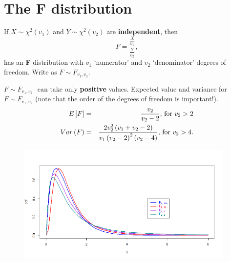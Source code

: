 \documentclass[smaller]{beamer}\usepackage[]{graphicx}\usepackage[]{color}
\begin{document}
\section{The F distribution}

\begin{frame}{\secname}
  \begin{definition}
  If $X\sim \chi ^{2}(v_{1})$ and $Y\sim \chi ^{2}(v_{2})$ are \textbf{%
  independent}, then%
  \begin{equation*}
  F=\frac{\frac{X}{v_{1}}}{\frac{Y}{v_{2}}},
  \end{equation*}%
  has an \textbf{F} distribution with $v_{1}$ `numerator' and $v_{2}$
  `denominator' degrees of freedom. Write as $F\sim F_{v_{1},v_{2}}$.
  \end{definition}

  $F\sim F_{v_{1},v_{2}}\,$\ can take only \textbf{positive }values. Expected value and variance for $F\sim F_{v_{1},v_{2}}$ (note that the order of the degrees of freedom is important!).
  \begin{eqnarray*}
  E\left[ F\right] &=&\frac{v_{2}}{v_{2}-2}\text{, for }v_{2}>2 \\
  Var\left( F\right) &=&\frac{2v_{2}^{2}\left( v_{1}+v_{2}-2\right) }{%
  v_{1}\left( v_{2}-2\right) ^{2}\left( v_{2}-4\right) }\text{, for }v_{2}>4.
  \end{eqnarray*}
\end{frame}

\begin{frame}{\secname}

  \begin{figure}[ptb]\centering
  \includegraphics[height=2.3324in, width=4.2462in]{img/F-dist_pds__6.pdf}%
  \end{figure}%
\end{frame}%
\end{document}
